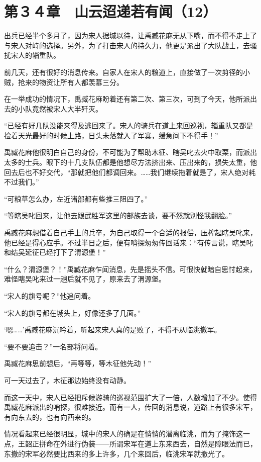\section{第３４章　山云迢递若有闻（12）}

出兵已经半个多月了，因为宋人据城以待，让禹臧花麻无从下嘴，而不得不走上了与宋人对峙的选择。另外，为了打击宋人的持久力，他更是派出了大队战士，去骚扰宋人的辎重队。

前几天，还有很好的消息传来。自家人在宋人的粮道上，直接做了一次剪径的小贼，抢来的物资让所有人都羡慕三分。

在一举成功的情况下，禹臧花麻盼着还有第二次、第三次，可到了今天，他所派出去的小队竟然被宋人大半歼灭。

“已经有好几队没能来得及逃回来了。宋人的骑兵在道上来回巡视，辎重队又都是捡着天光最好的时候上路，日头未落就入了军寨，缓急间下不得手！”

禹臧花麻他很明白自己的身份，不可能为了帮助木征、瞎吴叱去火中取栗，而派出太多的士兵。眼下的十几支队伍都是他想尽方法挤出来、压出来的，损失太重，他回去后也不好交代，“那就把他们都调回来。……我们继续拖着就是了，宋人绝对耗不过我们。”

“可粮草怎么办，左近诸部都有些推三阻四了。”

“等瞎吴叱回来，让他去跟武胜军这里的部族去谈，要不然就别怪我翻脸。”

禹臧花麻想借着自己手上的兵卒，为自己取得一个合适的报偿，压榨起瞎吴叱来，他已经是得心应手。不过半日之后，便有哨探匆匆传回话来：“有传言说，瞎吴叱和结吴延征已经打下了渭源堡！”

“什么？渭源堡？！”禹臧花麻乍闻消息，先是摇头不信。可很快就暗自思忖起来，难怪瞎吴叱来过一趟后就不见了，原来去了渭源堡。

“宋人的旗号呢？”他追问着。

“宋人的旗号都在城头上，好像还多了几面。”

‘嗯……’禹臧花麻沉吟着，听起来宋人真的是败了，不得不从临洮撤军。

“要不要追击？”一名部将问着。

禹臧花麻思前想后，“再等等，等木征他先动！”

可一天过去了，木征那边始终没有动静。

而这一天中，宋人已经把斥候游骑的巡视范围扩大了一倍，人数增加了不少。使得禹臧花麻派出的哨探，很难接近。而有一人，传回的消息说，道路上有很多宋军，有向东去的，也有向西来的。

情况看起来已经很明显，城中的宋人的确是在悄悄的潜离临洮，而为了掩饰这一点，王韶正拼命在外进行伪装——所谓宋军在道上东来西去，自然是障眼法而已，东撤的宋军必然要比西来的多上许多，几个来回后，临洮宋军就撤光了。


